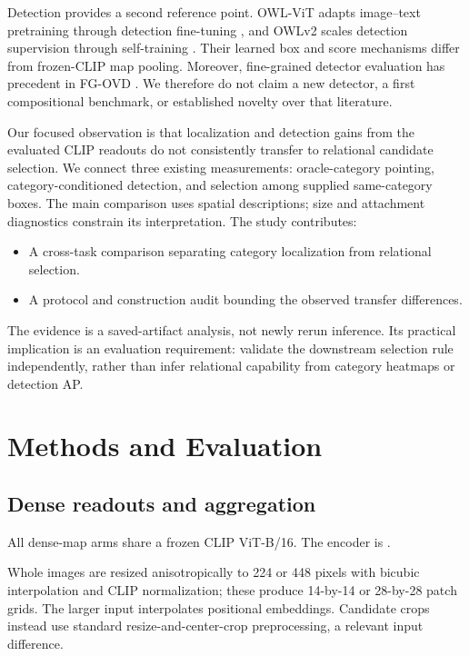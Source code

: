 \documentclass[10pt,twocolumn,letterpaper]{article}
\providecommand{\tightlist}{\setlength{\itemsep}{0pt}\setlength{\parskip}{0pt}}
\begin{document}
Detection provides a second reference point. OWL-ViT adapts image--text
pretraining through detection fine-tuning \citep{minderer2022owlvit},
and OWLv2 scales detection supervision through self-training
\citep{minderer2023owlv2}. Their learned box and score mechanisms differ
from frozen-CLIP map pooling. Moreover, fine-grained detector evaluation
has precedent in FG-OVD \citep{bianchi2023fgovd}. We therefore do not
claim a new detector, a first compositional benchmark, or established
novelty over that literature.

Our focused observation is that localization and detection gains from
the evaluated CLIP readouts do not consistently transfer to relational
candidate selection. We connect three existing measurements:
oracle-category pointing, category-conditioned detection, and selection
among supplied same-category boxes. The main comparison uses spatial
descriptions; size and attachment diagnostics constrain its
interpretation. The study contributes:

\begin{itemize}
\tightlist
\item
  A cross-task comparison separating category localization from
  relational selection.
\item
  A protocol and construction audit bounding the observed transfer
  differences.
\end{itemize}

The evidence is a saved-artifact analysis, not newly rerun inference.
Its practical implication is an evaluation requirement: validate the
downstream selection rule independently, rather than infer relational
capability from category heatmaps or detection AP.

\section{Methods and Evaluation}\label{methods-and-evaluation}

\subsection{Dense readouts and
aggregation}\label{dense-readouts-and-aggregation}

All dense-map arms share a frozen CLIP ViT-B/16. The encoder is
.

Whole images are resized anisotropically to 224 or 448 pixels with
bicubic interpolation and CLIP normalization; these produce 14-by-14 or
28-by-28 patch grids. The larger input interpolates positional
embeddings. Candidate crops instead use standard resize-and-center-crop
preprocessing, a relevant input difference.
\end{document}
